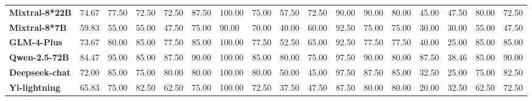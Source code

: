 \begin{table}[h]
\begin{adjustbox}{angle=90}
{\begin{tabular}{lllllllllllllllll}
\textbf{Mixtral-8*22B}     & 74.67                       & 77.50                    & 72.50               & 72.50        & 87.50                      & 100.00             & 75.00                & 57.50                  & 72.50                       & 90.00               & 90.00                      & 80.00                         & 45.00                  & 47.50             & 80.00                     & 72.50              \\
\textbf{Mixtral-8*7B}      & 59.83                       & 55.00                    & 55.00               & 47.50        & 75.00                      & 90.00              & 70.00                & 40.00                  & 60.00                       & 92.50               & 75.00                      & 75.00                         & 30.00                  & 30.00             & 55.00                     & 47.50              \\
\textbf{GLM-4-Plus}        & 73.67                       & 80.00                    & 85.00               & 77.50        & 85.00                      & 100.00             & 77.50                & 52.50                  & 65.00                       & 92.50               & 77.50                      & 77.50                         & 40.00                  & 25.00             & 85.00                     & 85.00              \\
\textbf{Qwen-2.5-72B}      & 84.47                       & 95.00                    & 85.00               & 87.50        & 90.00                      & 100.00             & 85.00                & 80.00                  & 75.00                       & 97.50               & 90.00                      & 80.00                         & 87.50                  & 38.46             & 85.00                     & 90.00              \\
\textbf{Deepseek-chat}     & 72.00                       & 85.00                    & 75.00               & 80.00        & 80.00                      & 100.00             & 80.00                & 50.00                  & 45.00                       & 97.50               & 87.50                      & 85.00                         & 32.50                  & 25.00             & 75.00                     & 82.50              \\
\textbf{Yi-lightning}      & 65.83                       & 75.00                    & 82.50               & 62.50        & 75.00                      & 100.00             & 72.50                & 37.50                  & 47.50                       & 87.50               & 80.00                      & 80.00                         & 20.00                  & 32.50             & 62.50                     & 72.50   \\
\end{tabular}}
\end{adjustbox}
\end{table}

